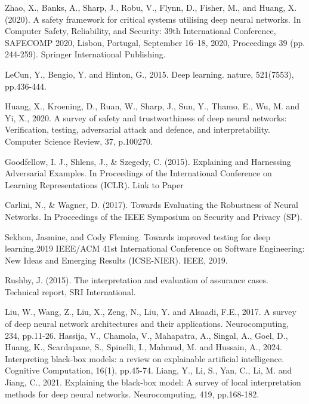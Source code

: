 \label{chp:5}
\begin{singlespace}
\begin{thebibliography}{}


Zhao, X., Banks, A., Sharp, J., Robu, V., Flynn, D., Fisher, M., and Huang, X. (2020). A safety framework for critical systems utilising deep neural networks. In Computer Safety, Reliability, and Security: 39th International Conference, SAFECOMP 2020, Lisbon, Portugal, September 16–18, 2020, Proceedings 39 (pp. 244-259). Springer International Publishing.


LeCun, Y., Bengio, Y. and Hinton, G., 2015. Deep learning. nature, 521(7553), pp.436-444.

Huang, X., Kroening, D., Ruan, W., Sharp, J., Sun, Y., Thamo, E., Wu, M. and Yi, X., 2020. A survey of safety and trustworthiness of deep neural networks: Verification, testing, adversarial attack and defence, and interpretability. Computer Science Review, 37, p.100270.


 Goodfellow, I. J., Shlens, J., \& Szegedy, C. (2015). Explaining and Harnessing Adversarial Examples. In Proceedings of the International Conference on Learning Representations (ICLR). Link to Paper

 Carlini, N., \& Wagner, D. (2017). Towards Evaluating the Robustness of Neural Networks. In Proceedings of the IEEE Symposium on Security and Privacy (SP).
   
 Sekhon, Jasmine, and Cody Fleming. Towards improved testing for deep learning.2019 IEEE/ACM 41st International Conference on Software Engineering: New Ideas and Emerging Results (ICSE-NIER). IEEE, 2019.

Rushby, J. (2015). The interpretation and evaluation of assurance cases. Technical report, SRI International.



 Liu, W., Wang, Z., Liu, X., Zeng, N., Liu, Y. and Alsaadi, F.E., 2017. A survey of deep neural network architectures and their applications. Neurocomputing, 234, pp.11-26.    Hassija, V., Chamola, V., Mahapatra, A., Singal, A., Goel, D., Huang, K., Scardapane, S., Spinelli, I., Mahmud, M. and Hussain, A., 2024. Interpreting black-box models: a review on explainable artificial intelligence. Cognitive Computation, 16(1), pp.45-74.
 Liang, Y., Li, S., Yan, C., Li, M. and Jiang, C., 2021. Explaining the black-box model: A survey of local interpretation methods for deep neural networks. Neurocomputing, 419, pp.168-182.


\end{thebibliography}
\end{singlespace}

